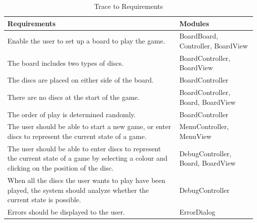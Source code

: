 \documentclass{article}
\begin{document}
{\begin{table}[ht]
\centering
\begin{tabular}{|p{6cm}|p{6cm}|}
\hline
\textbf{Requirements}                                                                                                                                                                         & \textbf{Modules}                  \\ \hline
Enable the user to set up a board to play the game.                                                                                                                                           & BoardBoard, Controller, BoardView \\ \hline
The board includes two types of discs.                                                                                                                                                        & BoardController, BoardView        \\ \hline
The discs are placed on either side of the board.                                                                                                                                             & BoardController                   \\ \hline
There are no discs at the start of the game.                                                                                                                                                  & BoardController, Board, BoardView \\ \hline
The order of play is determined randomly.                                                                                                                                                     & BoardController                   \\ \hline
The user should be able to start a new game, or enter discs to represent the current state of a game.                               & MenuController, MenuView          \\ \hline
The user should be able to enter discs to represent the current state of a game by selecting a colour and clicking on the position of the disc.& DebugController, Board, BoardView \\ \hline
When all the discs the user wants to play have been played, the system should analyze whether the current state is possible. & DebugController                   \\ \hline
Errors should be displayed to the user.                                                                                                                                                       & ErrorDialog                       \\ \hline
\end{tabular}
\caption{Trace to Requirements}
\end{table}

}
\end{document}
